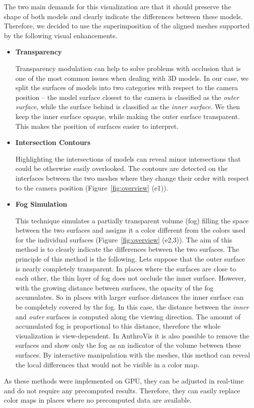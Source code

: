 \documentclass[final,5p,times]{elsarticle}
\begin{document}
\begin{sloppypar}
The two main demands for this visualization are that it should preserve the shape of both models and clearly indicate the differences between these models.
Therefore, we decided to use the superimposition of the aligned meshes supported by the following visual enhancements.
\end{sloppypar}
\begin{itemize}
\item{\textbf{Transparency}} 

Transparency modulation can help to solve problems with occlusion that is one of the most common issues when dealing with 3D models. 
In our case, we split the surfaces of models into two categories with respect to the camera position -- the model surface closest to the camera is classified as the \textit{outer surface}, while the surface behind is classified as the \textit{inner surface}.
We then keep the inner surface opaque, while making the outer surface transparent.
This makes the position of surfaces easier to interpret.
\item{\textbf{Intersection Contours}}

Highlighting the intersections of models can reveal minor intersections that could be otherwise easily overlooked. 
The contours are detected on the interfaces between the two meshes where they change their order with respect to the camera position (Figure~\ref{fig:overview} (e1)). 
\item{\textbf{Fog Simulation}}

This technique simulates a partially transparent volume (fog) filling the space between the two surfaces and assigns it a color different from the colors used for the individual surfaces (Figure~\ref{fig:overview} (e2,3)). 
The aim of this method is to clearly indicate the differences between the two surfaces.
The principle of this method is the following.
Lets suppose that the outer surface is nearly completely transparent.
In places where the surfaces are close to each other, the thin layer of fog does not occlude the inner surface.
However, with the growing distance between surfaces, the opacity of the fog accumulates.
So in places with larger surface distances the inner surface can be completely covered by the fog. 
In this case, the distance between the \textit{inner} and \textit{outer} surfaces is computed along the viewing direction.
The amount of accumulated fog is proportional to this distance, therefore the whole visualization is view-dependent.
In AnthroVis it is also possible to remove the surfaces and show only the fog as an indicator of the volume between these surfaces. 
By interactive manipulation with the meshes, this method can reveal the local differences that would not be visible in a color map.
\end{itemize}
As these methods were implemented on GPU, they can be adjusted in real-time and do not require any precomputed results.
Therefore, they can easily replace color maps in places where no precomputed data are available.
\end{document}
